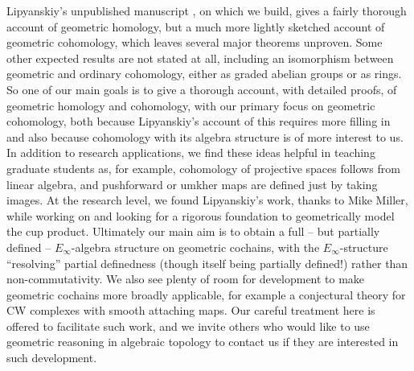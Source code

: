 Lipyanskiy's unpublished manuscript \cite{Lipy14}, on which we build, gives a fairly thorough account of geometric homology, but a much more lightly sketched account of geometric cohomology, which leaves several major theorems  unproven.
Some other expected results are not stated at all, including an isomorphism between geometric and ordinary cohomology, either as graded abelian groups or as rings.
So one of our main goals is to give a thorough account, with detailed proofs, of geometric homology and cohomology, with our primary focus on geometric cohomology, both because Lipyanskiy's account of this requires more filling in and also because cohomology with its algebra structure is of more interest to us.
In addition to research applications, we find these ideas helpful in teaching graduate students as, for example, cohomology of projective spaces follows from linear algebra, and pushforward or umkher maps are defined just by taking images.
At the research level, we found Lipyanskiy's work, thanks to Mike Miller, while working on \cite{FMS-flows} and looking for a rigorous foundation to geometrically model the cup product.
Ultimately our main aim is to obtain a full -- but partially defined -- $E_\infty$-algebra structure on geometric cochains, with the $E_\infty$-structure ``resolving'' partial definedness (though itself being partially defined!) rather than non-commutativity.
We also see plenty of room for development to make geometric cochains more broadly applicable, for example a conjectural theory for CW complexes with smooth attaching maps.
Our careful treatment here is offered to facilitate such work, and we invite others who would like to use geometric reasoning in algebraic topology to contact us if they are interested in such development.


